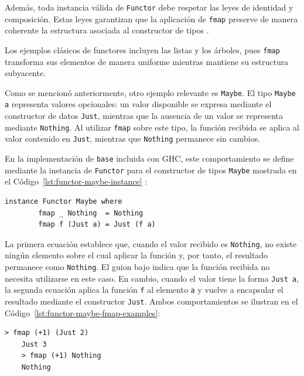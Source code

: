 Además, toda instancia válida de \texttt{Functor} debe respetar las leyes de identidad y composición. Estas leyes garantizan que la aplicación de \texttt{fmap} preserve de manera coherente la estructura asociada al constructor de tipos \cite{Yorgey2009}.

Los ejemplos clásicos de functores incluyen las listas y los árboles, pues \texttt{fmap} transforma sus elementos de manera uniforme mientras mantiene su estructura subyacente.

Como se mencionó anteriormente, otro ejemplo relevante es \texttt{Maybe}. El tipo \texttt{Maybe a} representa valores opcionales: un valor disponible se expresa mediante el constructor de datos \texttt{Just}, mientras que la ausencia de un valor se representa mediante \texttt{Nothing}. Al utilizar \texttt{fmap} sobre este tipo, la función recibida se aplica al valor contenido en \texttt{Just}, mientras que \texttt{Nothing} permanece sin cambios.

En la implementación de \texttt{base} incluida con GHC, este comportamiento se define mediante la instancia de \texttt{Functor} para el constructor de tipos \texttt{Maybe} mostrada en el Código~\ref{lst:functor-maybe-instance} \cite{GHCInternalBase}:

\begin{lstlisting}[style=haskell,caption={Instancia de \texttt{Functor} para \texttt{Maybe}.},label={lst:functor-maybe-instance}]
    instance Functor Maybe where
        fmap _ Nothing  = Nothing
        fmap f (Just a) = Just (f a)
\end{lstlisting}

La primera ecuación establece que, cuando el valor recibido es \texttt{Nothing}, no existe ningún elemento sobre el cual aplicar la función y, por tanto, el resultado permanece como \texttt{Nothing}. El guion bajo indica que la función recibida no necesita utilizarse en este caso. En cambio, cuando el valor tiene la forma \texttt{Just a}, la segunda ecuación aplica la función \texttt{f} al elemento \texttt{a} y vuelve a encapsular el resultado mediante el constructor \texttt{Just}. Ambos comportamientos se ilustran en el Código~\ref{lst:functor-maybe-fmap-examples}:

\begin{lstlisting}[style=haskell,caption={Aplicación de \texttt{fmap} sobre valores de tipo \texttt{Maybe}.},label={lst:functor-maybe-fmap-examples}]
    > fmap (+1) (Just 2)
    Just 3
    > fmap (+1) Nothing
    Nothing
\end{lstlisting}

